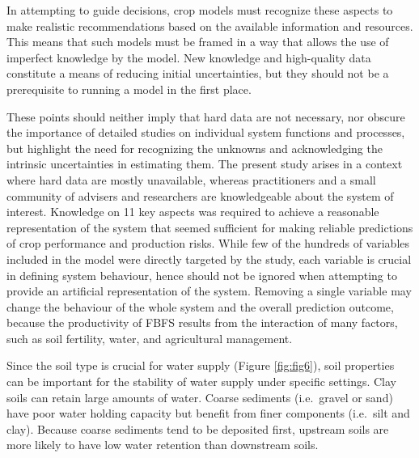 \documentclass[]{elsarticle} %
\begin{document}
In attempting to guide decisions, crop models must recognize these aspects to make realistic recommendations based on the available information and resources. This means that such models must be framed in a way that allows the use of imperfect knowledge by the model. New knowledge and high-quality data constitute a means of reducing initial uncertainties, but they should not be a prerequisite to running a model in the first place.

These points should neither imply that hard data are not necessary, nor obscure the importance of detailed studies on individual system functions and processes, but highlight the need for recognizing the unknowns and acknowledging the intrinsic uncertainties in estimating them. The present study arises in a context where hard data are mostly unavailable, whereas practitioners and a small community of advisers and researchers are knowledgeable about the system of interest. Knowledge on 11 key aspects was required to achieve a reasonable representation of the system that seemed sufficient for making reliable predictions of crop performance and production risks. While few of the hundreds of variables included in the model were directly targeted by the study, each variable is crucial in defining system behaviour, hence should not be ignored when attempting to provide an artificial representation of the system. Removing a single variable may change the behaviour of the whole system and the overall prediction outcome, because the productivity of FBFS results from the interaction of many factors, such as soil fertility, water, and agricultural management.

Since the soil type is crucial for water supply (Figure \ref{fig:fig6}), soil properties can be important for the stability of water supply under specific settings. Clay soils can retain large amounts of water. Coarse sediments (i.e.~gravel or sand) have poor water holding capacity but benefit from finer components (i.e.~silt and clay). Because coarse sediments tend to be deposited first, upstream soils are more likely to have low water retention than downstream soils.
\end{document}
